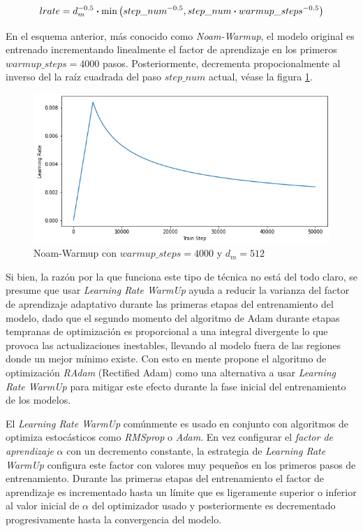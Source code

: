 \begin{equation}
    lrate = d_{m}^{-0.5} \vdot \min\big(step\_num^{-0.5}, step\_num \vdot warmup\_steps^{-0.5} \big)
\end{equation}

En el esquema anterior, más conocido como \textit{Noam-Warmup}, el modelo original es entrenado
incrementando linealmente el factor de aprendizaje en los primeros $warmup\_steps=4000$ pasos.
Posteriormente, decrementa propocionalmente al inverso del la raíz cuadrada del paso $step\_num$
actual, véase la figura \ref{fig:noam}.

\begin{figure}[ht!]
    \centering
    \includegraphics[width=0.5 \textwidth]{Chapters/1. Transformer/Figures/transformer/noam.png}
    \caption{Noam-Warmup con $warmup\_steps=4000$ y $d_{m} = 512$}
    \label{fig:noam}
\end{figure}

Si bien, la razón por la que funciona este tipo de técnica no está del todo claro, se presume que usar
\textit{Learning Rate WarmUp} ayuda a reducir la varianza del factor de aprendizaje adaptativo durante
las primeras etapas del entrenamiento del modelo, dado que el segundo momento del algoritmo
de Adam durante etapas tempranas de optimización es proporcional a una integral divergente
\cite{DBLP:journals/corr/abs-1908-03265} lo que provoca las actualizaciones inestables, llevando al
modelo fuera de las regiones donde un mejor mínimo existe. Con esto en mente
\citeauthor{DBLP:journals/corr/abs-1908-03265} propone el algoritmo de optimización
\textit{RAdam} (Rectified Adam) como una alternativa a usar \textit{Learning Rate WarmUp} para mitigar
este efecto durante la fase inicial del entrenamiento de los modelos.

El \textit{Learning Rate WarmUp}
comúnmente es usado en conjunto con algoritmos de optimiza estocásticos como \textit{RMSprop} o
\textit{Adam}. En vez configurar el \textit{factor de aprendizaje} $\alpha$ con un decremento
constante, la estrategia de \textit{Learning Rate WarmUp} configura este factor con valores muy
pequeños en los primeros pasos de entrenamiento. Durante las primeras etapas del entrenamiento
el factor de aprendizaje es incrementado hasta un límite que es ligeramente superior o inferior al valor
inicial de $\alpha$ del optimizador usado y posteriormente es  decrementado
progresivamente hasta la convergencia del modelo.

